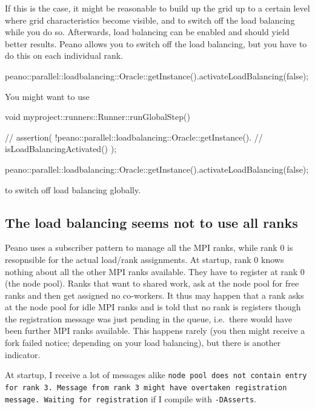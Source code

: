 \noindent
If this is the case, it might be reasonable to build up the grid up to a certain
level where grid characteristics become visible, and to switch off the load
balancing while you do so.
Afterwards, load balancing can be enabled and should yield better results. 
Peano allows you to switch off the load balancing, but you have to do this on
each individual rank. 

\begin{code}
peano::parallel::loadbalancing::Oracle::getInstance().activateLoadBalancing(false);
\end{code}


You might want to use
\begin{code}
void myproject::runners::Runner::runGlobalStep() {
  // assertion( !peano::parallel::loadbalancing::Oracle::getInstance().
  // isLoadBalancingActivated() );

  peano::parallel::loadbalancing::Oracle::getInstance().activateLoadBalancing(false);
}
\end{code}

\noindent
to switch off load balancing globally.



\subsection{The load balancing seems not to use all ranks}

\noindent
Peano uses a subscriber pattern to manage all the MPI ranks, while rank 0 is
resopnsible for the actual load/rank assignments.
At startup, rank 0 knows nothing about all the other MPI ranks available.
They have to register at rank 0 (the node pool).
Ranks that want to shared work, ask at the node pool for free ranks and then get
assigned no co-workers.
It thus may happen that a rank asks at the node pool for idle MPI ranks and is
told that no rank is registers though the registration message was just pending
in the queue, i.e.~there would have been further MPI ranks available.
This happens rarely (you then might receive a fork failed notice; depending on
your load balancing), but there is another indicator.

\begin{smell}
  At startup, I receive a lot of messages alike \texttt{node pool does not
  contain entry for rank 3. Message from rank 3 might have overtaken
  registration message. Waiting for registration} if I compile with
  \texttt{-DAsserts}.
\end{smell}

